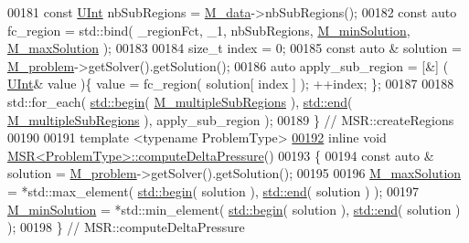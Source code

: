 \begin{DoxyCode}
00181     \textcolor{keyword}{const} \hyperlink{namespaceFVCode3D_a4bf7e328c75d0fd504050d040ebe9eda}{UInt} nbSubRegions = \hyperlink{classFVCode3D_1_1MSR_a03e013e5191655455e66563e815f262b}{M\_data}->nbSubRegions();
00182     \textcolor{keyword}{const} \textcolor{keyword}{auto} fc\_region = std::bind( \_regionFct, \_1, nbSubRegions, 
      \hyperlink{classFVCode3D_1_1MSR_a6e8eb6a0513e4b46241950b8ee2b7212}{M\_minSolution}, \hyperlink{classFVCode3D_1_1MSR_a292e038fb48f7f4f39238d375ea6f6e0}{M\_maxSolution} );
00183 
00184     \textcolor{keywordtype}{size\_t} index = 0;
00185     \textcolor{keyword}{const} \textcolor{keyword}{auto} & solution = \hyperlink{classFVCode3D_1_1MSR_a531760a5415f63b7be6087ab117031e5}{M\_problem}->getSolver().getSolution();
00186     \textcolor{keyword}{auto} apply\_sub\_region = [&] ( \hyperlink{namespaceFVCode3D_a4bf7e328c75d0fd504050d040ebe9eda}{UInt}& value )\{ value = fc\_region( solution[ index ] ); ++index; \};
00187 
00188     std::for\_each( \hyperlink{namespacestd_acec9a198880c12f51f02be95a298a48b}{std::begin}( \hyperlink{classFVCode3D_1_1MSR_a38cba0138e4ebd055d47b3d9d9d32623}{M\_multipleSubRegions} ), 
      \hyperlink{namespacestd_aeb4b319cf9afda99ba1f47d32df15bc9}{std::end}( \hyperlink{classFVCode3D_1_1MSR_a38cba0138e4ebd055d47b3d9d9d32623}{M\_multipleSubRegions} ), apply\_sub\_region );
00189 \} \textcolor{comment}{// MSR::createRegions}
00190 
00191 \textcolor{keyword}{template} <\textcolor{keyword}{typename} ProblemType>
\hypertarget{MultipleSubRegions_8hpp_source.tex_l00192}{}\hyperlink{classFVCode3D_1_1MSR_afc43a5ff2dc8f0dce321aa3d03b45194}{00192} \textcolor{keyword}{inline} \textcolor{keywordtype}{void} \hyperlink{classFVCode3D_1_1MSR_afc43a5ff2dc8f0dce321aa3d03b45194}{MSR<ProblemType>::computeDeltaPressure}()
00193 \{
00194     \textcolor{keyword}{const} \textcolor{keyword}{auto} & solution = \hyperlink{classFVCode3D_1_1MSR_a531760a5415f63b7be6087ab117031e5}{M\_problem}->getSolver().getSolution();
00195 
00196     \hyperlink{classFVCode3D_1_1MSR_a292e038fb48f7f4f39238d375ea6f6e0}{M\_maxSolution} = *std::max\_element( \hyperlink{namespacestd_acec9a198880c12f51f02be95a298a48b}{std::begin}( solution ), 
      \hyperlink{namespacestd_aeb4b319cf9afda99ba1f47d32df15bc9}{std::end}( solution ) );
00197     \hyperlink{classFVCode3D_1_1MSR_a6e8eb6a0513e4b46241950b8ee2b7212}{M\_minSolution} = *std::min\_element( \hyperlink{namespacestd_acec9a198880c12f51f02be95a298a48b}{std::begin}( solution ), 
      \hyperlink{namespacestd_aeb4b319cf9afda99ba1f47d32df15bc9}{std::end}( solution ) );
00198 \} \textcolor{comment}{// MSR::computeDeltaPressure}

\end{DoxyCode}
